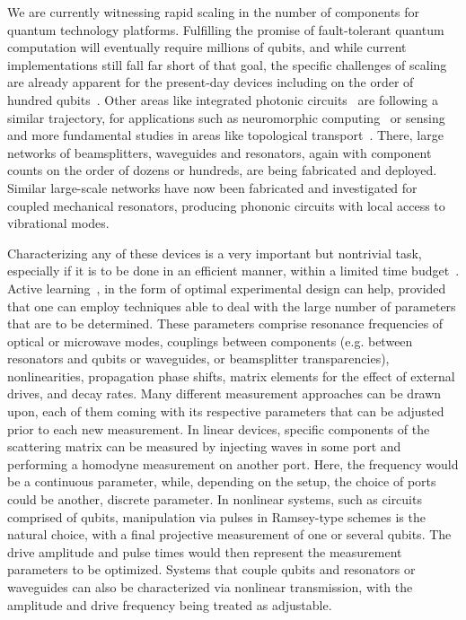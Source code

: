 \documentclass[10pt]{iopart}  %
\begin{document}
We are currently witnessing rapid scaling in the number of components for quantum technology platforms.
Fulfilling the promise of fault-tolerant quantum computation will eventually require millions of qubits, and while current implementations still fall far short of that goal, the specific challenges of scaling are already apparent for the present-day devices including on the order of hundred qubits~\cite{kim_evidence_2023}.
Other areas like integrated photonic circuits~\cite{wang_integrated_2020} are following a similar trajectory, for applications such as neuromorphic computing~\cite{wetzstein_inference_2020} or sensing and more fundamental studies in areas like topological transport~\cite{ningyuan_time-_2015}.
There, large networks of beamsplitters, waveguides and resonators, again with component counts on the order of dozens or hundreds, are being fabricated and deployed.
Similar large-scale networks have now been fabricated and investigated for coupled mechanical resonators, producing phononic circuits with local access to vibrational modes.
\ioptwocol

Characterizing any of these devices is a very important but nontrivial task, especially if it is to be done in an efficient manner, within a limited time budget~\cite{gebhart_learning_2023}.
Active learning~\cite{settles_active_2012}, in the form of optimal experimental design can help, provided that one can employ techniques able to deal with the large number of parameters that are to be determined.
These parameters comprise resonance frequencies of optical or microwave modes, couplings between components (e.g. between resonators and qubits or waveguides, or beamsplitter transparencies), nonlinearities, propagation phase shifts, matrix elements for the effect of external drives, and decay rates.
Many different measurement approaches can be drawn upon, each of them coming with its respective parameters that can be adjusted prior to each new measurement.
In linear devices, specific components of the scattering matrix can be measured by injecting waves in some port and performing a homodyne measurement on another port.
Here, the frequency would be a continuous parameter, while, depending on the setup, the choice of ports could be another, discrete parameter.
In nonlinear systems, such as circuits comprised of qubits, manipulation via pulses in Ramsey-type schemes is the natural choice, with a final projective measurement of one or several qubits.
The drive amplitude and pulse times would then represent the measurement parameters to be optimized.
Systems that couple qubits and resonators or waveguides can also be characterized via nonlinear transmission, with the amplitude and drive frequency being treated as adjustable.
\end{document}
